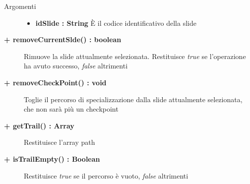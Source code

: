 \begin{description}
\begin{description}
		\begin{description}
			\item[Argomenti] \hfill
				\begin{itemize}
				
					\item \textbf{idSlide : String	} \hfill
					È il codice identificativo della slide
					
				\end{itemize}
			
		\end{description}
			
	\end{description}
	
	\begin{description}
		\item[\textbf{\color{blue}+ removeCurrentSlde() : boolean			}] \hfill
			Rimuove la slide attualmente selezionata. Restituisce \textit{true} se l'operazione ha avuto successo, \textit{false} altrimenti 
			
	\end{description}
	
	\begin{description}
		\item[\textbf{\color{blue}+ removeCheckPoint() : void			}] \hfill
			Toglie il percorso di specializzazione dalla slide attualmente selezionata, che non sarà più un checkpoint
			
	\end{description}
	
	\begin{description}
		\item[\textbf{\color{blue}+ getTrail() : Array			}] \hfill
			Restituisce l'array path
			
	\end{description}
	
	\begin{description}
		\item[\textbf{\color{blue}+ isTrailEmpty() : Boolean			}] \hfill
			Restituisce \textit{true} se il percorso è vuoto, \textit{false} altrimenti
			
	\end{description}
	
	

\end{description}

